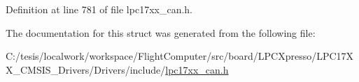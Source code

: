 \-Definition at line 781 of file lpc17xx\-\_\-can.\-h.



\-The documentation for this struct was generated from the following file\-:\begin{DoxyCompactItemize}
\item 
\-C\-:/tesis/localwork/workspace/\-Flight\-Computer/src/board/\-L\-P\-C\-Xpresso/\-L\-P\-C17\-X\-X\-\_\-\-C\-M\-S\-I\-S\-\_\-\-Drivers/\-Drivers/include/\hyperlink{lpc17xx__can_8h}{lpc17xx\-\_\-can.\-h}\end{DoxyCompactItemize}
